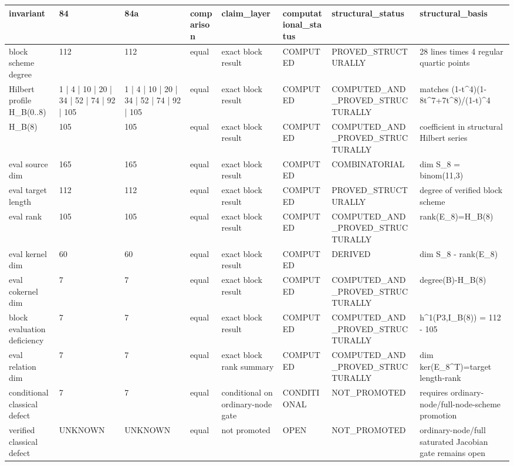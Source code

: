 \begin{tabular}{llllllll}
\hline
invariant & 84 & 84a & comparison & claim\_layer & computational\_status & structural\_status & structural\_basis \\
\hline
block scheme degree & 112 & 112 & equal & exact block result & COMPUTED & PROVED\_STRUCTURALLY & 28 lines times 4 regular quartic points \\
Hilbert profile H\_B(0..8) & 1 | 4 | 10 | 20 | 34 | 52 | 74 | 92 | 105 & 1 | 4 | 10 | 20 | 34 | 52 | 74 | 92 | 105 & equal & exact block result & COMPUTED & COMPUTED\_AND\_PROVED\_STRUCTURALLY & matches (1-t^4)(1-8t^7+7t^8)/(1-t)^4 \\
H\_B(8) & 105 & 105 & equal & exact block result & COMPUTED & COMPUTED\_AND\_PROVED\_STRUCTURALLY & coefficient in structural Hilbert series \\
eval source dim & 165 & 165 & equal & exact block result & COMPUTED & COMBINATORIAL & dim S\_8 = binom(11,3) \\
eval target length & 112 & 112 & equal & exact block result & COMPUTED & PROVED\_STRUCTURALLY & degree of verified block scheme \\
eval rank & 105 & 105 & equal & exact block result & COMPUTED & COMPUTED\_AND\_PROVED\_STRUCTURALLY & rank(E\_8)=H\_B(8) \\
eval kernel dim & 60 & 60 & equal & exact block result & COMPUTED & DERIVED & dim S\_8 - rank(E\_8) \\
eval cokernel dim & 7 & 7 & equal & exact block result & COMPUTED & COMPUTED\_AND\_PROVED\_STRUCTURALLY & degree(B)-H\_B(8) \\
block evaluation deficiency & 7 & 7 & equal & exact block result & COMPUTED & COMPUTED\_AND\_PROVED\_STRUCTURALLY & h^1(P3,I\_B(8)) = 112 - 105 \\
eval relation dim & 7 & 7 & equal & exact block rank summary & COMPUTED & COMPUTED\_AND\_PROVED\_STRUCTURALLY & dim ker(E\_8^T)=target length-rank \\
conditional classical defect & 7 & 7 & equal & conditional on ordinary-node gate & CONDITIONAL & NOT\_PROMOTED & requires ordinary-node/full-node-scheme promotion \\
verified classical defect & UNKNOWN & UNKNOWN & equal & not promoted & OPEN & NOT\_PROMOTED & ordinary-node/full saturated Jacobian gate remains open \\
\hline
\end{tabular}
